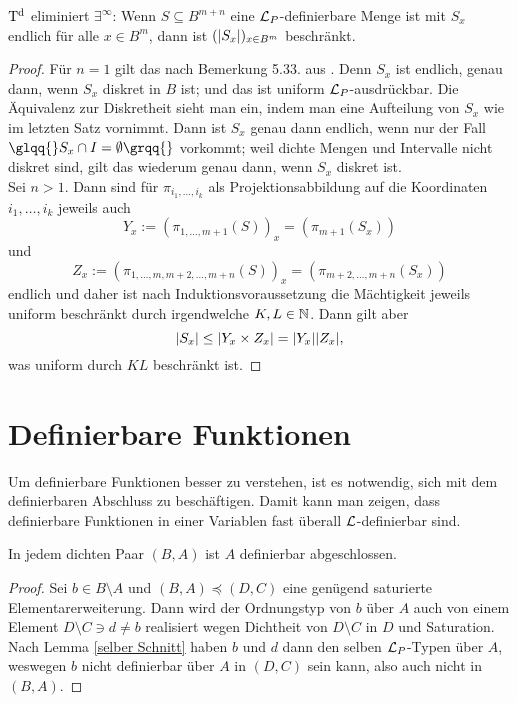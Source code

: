 \begin{lemma}
	$\operatorname{T^d}$ eliminiert $\exists^\infty$: Wenn $S\subseteq B^{m+n}$ eine $\mathcal{L}_P$-definierbare Menge ist mit $S_x$ endlich für alle $x\in B^m$, dann ist $({\left| S_x \right|})_{x\in B^m}$ beschränkt.
\end{lemma}
\begin{proof}
	Für $n=1$ gilt das nach Bemerkung 5.33. aus \cite{Lukas}. Denn $S_x$ ist endlich, genau dann, wenn $S_x$ diskret in $B$ ist; und das ist uniform $\mathcal{L}_P$-ausdrückbar. Die Äquivalenz zur Diskretheit sieht man ein, indem man eine Aufteilung von $S_x$ wie im letzten Satz vornimmt. Dann ist $S_x$ genau dann endlich, wenn nur der Fall $\glqq{}S_x\cap I=\emptyset\grqq{}$ vorkommt; weil dichte Mengen und Intervalle nicht diskret sind, gilt das wiederum genau dann, wenn $S_x$ diskret ist.\\
	Sei $n>1$. Dann sind für $\pi_{i_1,\dots,i_k}$ als Projektionsabbildung auf die Koordinaten $i_1,\dots,i_k$ jeweils auch $$Y_x:=(\pi_{1,\dots,m+1}(S))_x=(\pi_{m+1}(S_x))$$ und $$Z_x:=(\pi_{1,\dots,m,m+2,\dots,m+n}(S))_x=(\pi_{m+2,\dots,m+n}(S_x))$$ endlich und daher ist nach Induktionsvoraussetzung die Mächtigkeit jeweils uniform beschränkt durch irgendwelche $K,L\in\mathbb{N}$. Dann gilt aber $${\left| S_x \right|}\leq {\left| Y_x\times Z_x \right|}={\left| Y_x \right|}{\left| Z_x \right|},$$ was uniform durch $KL$ beschränkt ist.
\end{proof}

\section{Definierbare Funktionen}
Um definierbare Funktionen besser zu verstehen, ist es notwendig, sich mit dem definierbaren Abschluss zu beschäftigen. Damit kann man zeigen, dass definierbare Funktionen in einer Variablen \glqq{}fast überall\grqq{} $\mathcal{L}$-definierbar sind.

\begin{lemma}\label{A definierbar abgeschl}
	In jedem dichten Paar $(B,A)$ ist $A$ definierbar abgeschlossen.
\end{lemma}
\begin{proof}
	Sei $b\in B\setminus A$ und $(B,A)\preceq(D,C)$ eine genügend saturierte Elementarerweiterung. Dann wird der Ordnungstyp von $b$ über $A$ auch von einem Element $D\setminus C\ni d\neq b$ realisiert wegen Dichtheit von $D\setminus C$ in $D$ und Saturation.\newpage
	Nach Lemma \ref{selber Schnitt} haben $b$ und $d$ dann den selben $\mathcal{L}_P$-Typen über $A$, weswegen $b$ nicht definierbar über $A$ in $(D,C)$ sein kann, also auch nicht in $(B,A)$.
\end{proof}

